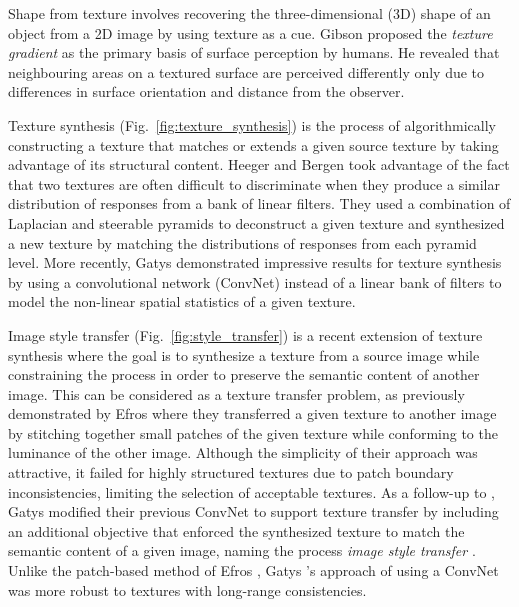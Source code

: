 Shape from texture involves recovering the
three-dimensional (3D) shape of an object from a 2D image by using texture as a 
cue. Gibson \cite{gibson1950perception} proposed the \emph{texture gradient} as 
the primary basis of surface perception by humans. He revealed that neighbouring areas on a textured surface are perceived differently only due to differences
in surface orientation and distance from the observer.



Texture synthesis (Fig.\ \ref{fig:texture_synthesis}) is the process of algorithmically constructing a texture that
matches or extends a given source texture by taking advantage of its structural 
content. Heeger and Bergen \cite{heeger1995pyramid} took advantage of the fact 
that two textures are often difficult to discriminate when they produce a similar 
distribution of responses from a bank of linear filters. They used a combination 
of Laplacian and steerable pyramids to deconstruct a given texture and 
synthesized a new texture by matching the distributions of responses from each
pyramid level. More recently, Gatys \etal \cite{gatys2015} demonstrated 
impressive results for texture synthesis by using a convolutional network (ConvNet) instead of a linear 
bank of filters to model the non-linear spatial statistics of a given texture.



Image style transfer (Fig.\ \ref{fig:style_transfer}) is a recent extension of texture synthesis where the goal is to 
synthesize a texture from a source image while constraining the process in order 
to preserve the semantic content of another image. This can be considered as a 
texture transfer problem, as previously demonstrated by Efros \etal \cite{efros2001image} where they transferred a given texture to another image by stitching together small patches of the given texture while conforming to the luminance of the other image. Although the simplicity of their approach was attractive, it failed for highly structured textures due to patch boundary inconsistencies, limiting the selection of acceptable textures. 
As a follow-up to \cite{gatys2015}, Gatys \etal modified their previous ConvNet to support texture transfer by including an additional objective that enforced the synthesized texture to match the semantic content of a given image, naming the process \emph{image style transfer} \cite{gatys2016image}. Unlike the patch-based method of Efros \etal \cite{efros2001image}, Gatys \etal's \cite{gatys2016image} approach of using a ConvNet was more robust to textures with long-range consistencies.

